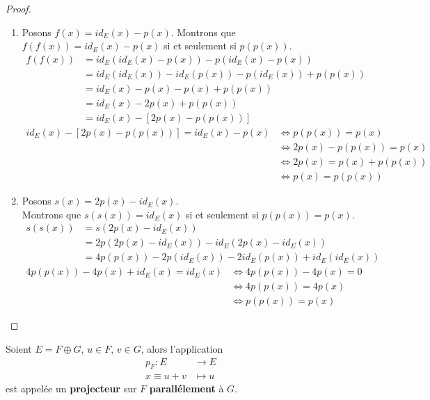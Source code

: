 \begin{proof}
    \begin{enumerate}
        \item Posons $f(x) = id_E(x) - p(x)$. Montrons que $f(f(x)) = id_E(x) - p(x)$ si et seulement si $p(p(x))$.
        \begin{align*}
            f(f(x)) &= id_E(id_E(x) - p(x)) - p(id_E(x) - p(x)) \\ 
            &= id_E(id_E(x)) - id_E(p(x)) - p(id_E(x)) + p(p(x)) \\ 
            &= id_E(x) - p(x) - p(x) + p(p(x)) \\ 
            &= id_E(x) - 2p(x) + p(p(x)) \\ 
            &= id_E(x) - [2p(x) - p(p(x))]
        \end{align*}
        \begin{align*}
            id_E(x) - [2p(x) - p(p(x))] = id_E(x) - p(x) &\iff p(p(x)) = p(x) \\ 
            &\iff 2p(x) - p(p(x)) = p(x) \\ 
            &\iff 2p(x) = p(x) + p(p(x)) \\
            &\iff p(x) = p(p(x))
        \end{align*}
        \item Posons $s(x) = 2p(x) - id_E(x)$. 
        \\
        Montrons que $s(s(x)) = id_E(x)$ si et seulement si $p(p(x)) = p(x)$.
        \begin{align*}
            s(s(x)) &= s(2p(x) - id_E(x)) \\
            &= 2p(2p(x) - id_E(x)) - id_E(2p(x) - id_E(x)) \\
            &= 4p(p(x)) - 2p(id_E(x)) - 2id_E(p(x)) + id_E(id_E(x))
        \end{align*}
        \begin{align*}
            4p(p(x)) - 4p(x) + id_E(x) = id_E(x) &\iff 4p(p(x)) - 4p(x) = 0 \\
            &\iff 4p(p(x)) = 4p(x) \\
            &\iff p(p(x)) = p(x)
        \end{align*}
    \end{enumerate}
\end{proof}

\begin{definition}
    Soient $E = F \oplus G$, $u \in F$, $v \in G$, alors l'application 
    \begin{align*}
        p_F : E &\to E \\
            x \equiv u + v &\mapsto u
    \end{align*}    
    est appelée un \textbf{projecteur} sur $F$ \textbf{parallélement} à $G$.
\end{definition}

